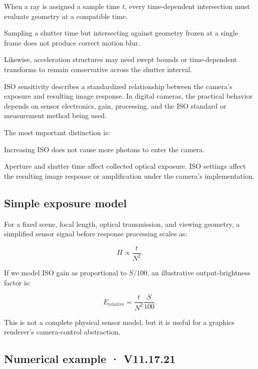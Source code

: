 \hypertarget{02-foundations-ii-ch036-a-critical-ray-tracing-implementation-detail}{}

When a ray is assigned a sample time \(t\), every time-dependent intersection must evaluate geometry at a compatible time.

Sampling a shutter time but intersecting against geometry frozen at a single frame does not produce correct motion blur.

Likewise, acceleration structures may need swept bounds or time-dependent transforms to remain conservative across the shutter interval.

ISO sensitivity describes a standardized relationship between the camera's exposure and resulting image response. In digital cameras, the practical behavior depends on sensor electronics, gain, processing, and the ISO standard or measurement method being used.

The most important distinction is:

Increasing ISO does not cause more photons to enter the camera.

Aperture and shutter time affect collected optical exposure. ISO settings affect the resulting image response or amplification under the camera's implementation.

\subsection{Simple exposure model}\label{02-foundations-ii-ch036-simple-exposure-model}

\hypertarget{02-foundations-ii-ch036-simple-exposure-model}{}

For a fixed scene, focal length, optical transmission, and viewing geometry, a simplified sensor signal before response processing scales as:

\[ H\propto\frac t{N^2}. \]

If we model ISO gain as proportional to \(S/100\), an illustrative output-brightness factor is:

\[ \boxed{ E_{\mathrm{relative}} = \frac t{N^2}\frac S{100}. } \]

This is not a complete physical sensor model, but it is useful for a graphics renderer's camera-control abstraction.

\subsection{Numerical example · V11.17.21}\label{02-foundations-ii-ch036-numerical-example-v11.17.21}

